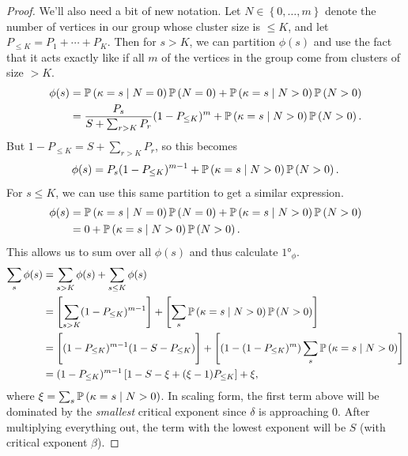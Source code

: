 \documentclass[twoside,10pt]{article}
\begin{document}
\begin{proof}
	We'll also need a bit of new notation. Let $N \in \left\{ 0, \dots, m \right\}$ denote the number of vertices in our group whose cluster size is $\leq K$, and let $P_{\leq K} = P_1 + \cdots + P_{K}$. Then for $s>K$, we can partition $\phi(s)$ and use the fact that it acts exactly like \ER if all $m$ of the vertices in the group come from clusters of size $> K$.
	\begin{align*}
		\phi(s) &= \P{ \kappa = s \;|\; N = 0}\P{ N=0 } + \P{ \kappa = s \;|\; N>0 } \P{ N>0 } \\
			&= \frac{P_{s}}{S + \sum_{r>K}P_{r}} (1-P_{\leq K})^{m} + \P{ \kappa = s \;|\; N>0 } \P{ N>0 }.
	\end{align*}
	But $1-P_{\leq K} = S + \sum_{r>K}P_{r}$, so this becomes
	\[
		\phi(s) = P_{s}(1-P_{\leq K})^{m-1} + \P{ \kappa = s \;|\; N>0 } \P{ N>0 }.
	\]
	For $s \leq K$, we can use this same partition to get a similar expression.
	\begin{align*}
		\phi(s) &= \P{ \kappa = s \;|\; N = 0}\P{ N=0 } + \P{ \kappa = s \;|\; N>0 } \P{ N>0 } \\
			&= 0 + \P{ \kappa = s \;|\; N>0 } \P{ N>0 }.
	\end{align*}
	This allows us to sum over all $\phi(s)$ and thus calculate $\ang{1}_{\phi}$.
	\begin{align*}
		\sum_{s} \phi(s) &= \sum_{s > K} \phi(s) + \sum_{ s \leq K}\phi(s) \\
				 &= \left[ \sum_{s>K}(1-P_{\leq K})^{m-1} \right] + \left[ \sum_{s} \P{ \kappa=s\;|\; N>0 }\P{ N>0 } \right] \\
				 &= \Bigg[ (1-P_{\leq K})^{m-1}(1-S-P_{\leq K}) \Bigg] + \left[ (1-(1-P_{\leq K})^{m}) \sum_{s} \P{ \kappa=s\;|\; N>0 } \right] \\
				 &= (1- P_{\leq K})^{m-1} \left[ 1 - S - \xi + (\xi-1)P_{\leq K} \right] + \xi,
	\end{align*}
	where $\xi = \sum_{s} \P{ \kappa=s\;|\; N>0 }$. In scaling form, the first term above will be dominated by the \emph{smallest} critical exponent since $\delta$ is approaching 0. After multiplying everything out, the term with the lowest exponent will be $S$ (with critical exponent $\beta$).


\end{proof}
\end{document}

